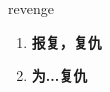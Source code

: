 
\begin{frame}
{\huge revenge}
\begin{center}
\begin{enumerate}\Large
  \item \textbf{报复，复仇}
  \item \textbf{为...复仇}
\end{enumerate}
\end{center}
\end{frame}
